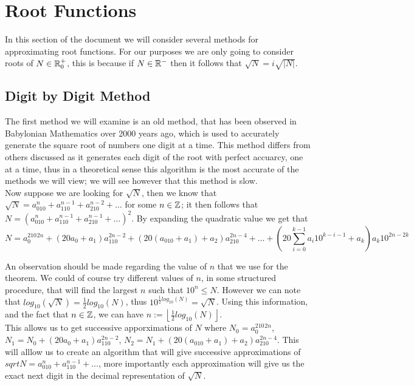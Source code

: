 \section{Root Functions}
\label{SEC_"Root Functions"}

In this section of the document we will consider several methods for approximating root functions. For our purposes we are only going to consider roots of \(N \in \mathbb{R}^+_0\), this is because if \(N \in \mathbb{R}^-\) then it follows that \(\sqrt{N} = i\sqrt{|N|}\).

\subsection{Digit by Digit Method}
\label{SUB_"Digit by Digit Method"}

The first method we will examine is an old method, that has been observed in Babylonian Mathematics over 2000 years ago, which is used to accurately generate the square root of numbers one digit at a time. This method differs from others discussed as it generates each digit of the root with perfect accuarcy, one at a time, thus in a theoretical sense this algorithm is the most accurate of the methods we will view; we will see however that this method is slow.\\

Now suppose we are looking for \(\sqrt{N}\), then we know that \(\sqrt{N} = a_010^n + a_110^{n-1} + a_210^{n-2} + \dots\) for some \(n \in \mathbb{Z}\); it then follows that \(N = (a_010^n + a_110^{n-1} + a_210^{n-1} + \dots)^2\). By expanding the quadratic value we get that \[N = a_0^210^{2n} + (20a_0 + a_1)a_110^{2n-2} + (20(a_010 + a_1) + a_2)a_210^{2n-4} + \dots + (20\sum_{i=0}^{k-1}a_i10^{k-i-1} + a_k)a_k10^{2n - 2k}\]

An observation should be made regarding the value of \(n\) that we use for the theorem. We could of course try different values of \(n\), in some structured procedure, that will find the largest \(n\) such that \(10^n \le N\). However we can note that \(log_{10}(\sqrt{N}) = \tfrac{1}{2}log_{10}(N)\), thus \(10^{\frac{1}{2}log_{10}(N)} = \sqrt{N}\). Using this information, and the fact that \(n \in \mathbb{Z}\), we can have \(n := \left\lfloor \tfrac{1}{2}log_{10}(N) \right\rfloor\). \\

This allows us to get successive apporximations of \(N\) where \(N_0 = a_0^210^{2n}\), \(N_1 = N_0 + (20a_0 + a_1)a_110^{2n-2}\), \(N_2 = N_1 + (20(a_010 + a_1) + a_2)a_210^{2n-4}\). This will alllow us to create an algorithm that will give successive approximations of \(sqrt{N} = a_010^n + a_110^{n-1} + \dots\), more importantly each approximation will give us the exact next digit in the decimal representation of \(\sqrt{N}\).\\

